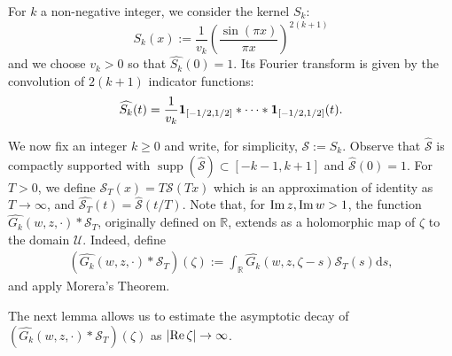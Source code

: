 \documentclass[a4paper,reqno,12pt]{amsart}
\DeclareMathOperator{\supp}{\mathrm{supp}}
\renewcommand{\S}{\mathcal{S}}
\newcommand{\U}{\mathcal{U}}
\renewcommand{\r}{\mathbb{R}}
\newcommand{\ft}{\widehat}
\renewcommand{\d}{\mathrm{d}}
\newcommand{\cd}{\cdot}
\newcommand{\1}{{\bf 1}}
\newcommand{\ra}{\rightarrow}
\renewcommand{\Re}{{\rm Re}\,}
\renewcommand{\Im}{{\rm Im}\,}
\begin{document}
For $k$ a non-negative integer, we consider the kernel $S_k$:
\begin{equation*}
S_k(x):=\frac{1}{v_k}\left(\frac{\sin(\pi x)}{\pi x}\right)^{2(k+1)}
\end{equation*}
and we choose $v_k>0$ so that $\ft{S_k}(0)=1$. Its Fourier transform is given by the convolution of $2(k+1)$ indicator functions:
\begin{equation*}
\ft{S_k}(t) = \frac{1}{v_k} \1_{[-1/2,1/2]}*\cdots*\1_{[-1/2,1/2]}(t).
\end{equation*}

We now fix an integer $k\geq0$ and write, for simplicity, $\S:=S_k$. Observe that $\ft{\S}$ is compactly supported with $\supp(\ft{\S})\subset[-k-1,k+1]$ and $\ft{\S}(0)=1$. For $T>0$, we define 
$\S_T(x)=T\S(Tx)$
which is an approximation of identity as $T\ra\infty$, and $\ft{\S_T}(t)=\ft{\S}(t/T)$. Note that, for $\Im{z},\Im{w}>1$, the function $\ft{G_k}(w,z,\cd)*\S_T$, originally defined on $\r$, extends as a holomorphic map of $\zeta$ to the domain $\U$. Indeed, define 
\begin{align*}
    \left(\ft{G_k}(w,z,\cd)*\S_T\right)(\zeta):=\int_{\r} \ft{G_k}(w,z,\zeta-s)\S_T(s)\d s,
\end{align*}
and apply Morera's Theorem.

The next lemma allows us to estimate the asymptotic decay of $\left(\ft{G_k}(w,z,\cd)*\S_T\right)(\zeta)$ as $|\Re{\zeta}|\ra\infty$.
\end{document}
